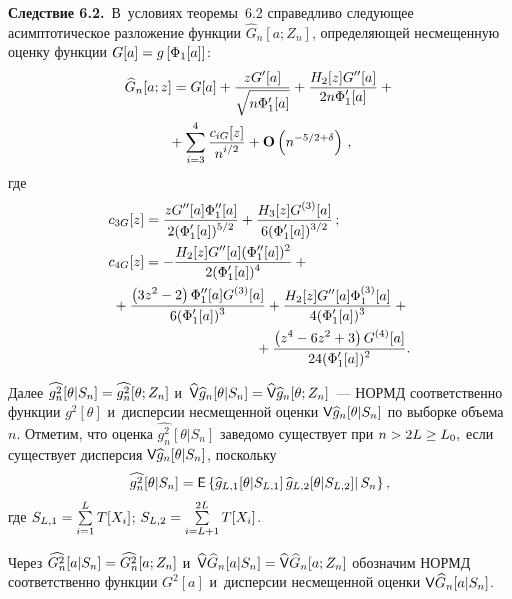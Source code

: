 \begin{multicols}{2}
\noindent
\textbf{Следствие 6.2.}\
 В~условиях теоремы~6.2 справедливо следующее асимптотическое разложение
  функции $\widehat{G}_n[a;Z_n]$, определяющей несмещенную оценку функции
  $G[a]\hm=g\left[\Phi_1[a]\right]$:
  \begin{multline*}
 \widehat{G}_n[a;z]=G[a]+\displaystyle\frac{\displaystyle z G'[a]\mathstrut}{\displaystyle \sqrt{n\Phi_1'[a]}\mathstrut}+
 \displaystyle\frac{\displaystyle H_2[z] G''[a]\mathstrut}{\displaystyle 2n \Phi_1'[a]\mathstrut} +{}\\
 {}+
 \sum\limits_{i=3}^4 \displaystyle\frac{\displaystyle c_{iG}[z]\mathstrut}{\displaystyle n^{i/2}\mathstrut}+\mathbf{O}\left(n^{-5/2+\delta}\right)\,,
 \end{multline*}
 где
 \begin{align*}
 c_{3G}[z]&=  \fr{z G''[a] \Phi_1''[a]}{2 (\Phi_1'[a])^{5/2}}+
 \fr{H_3[z] G^{(3)}[a]}{6 (\Phi_1'[a])^{3/2}}\,;
\\
 c_{4G}[z]&=  -\fr{H_2[z] G''[a] (\Phi_1''[a])^2}{2 (\Phi_1'[a])^4}+{}\\
& \hspace*{-8mm}{}+
 \fr{\left(3z^2-2\right) \Phi_1''[a] G^{(3)}[a]}{6 (\Phi_1'[a])^3}
 +\fr{H_2[z] G''[a] \Phi_1^{(3)}[a]}{4 (\Phi_1'[a])^3}+{}\\
&\hspace*{28mm} {}+
 \fr{\left(z^4-6 z^2+3\right) G^{(4)}[a]}{24 (\Phi_1'[a])^2}.
 \end{align*}


  Далее
  $\widehat{g^2_n}[\theta|S_n]\hm=\widehat{g^2_n}[\theta;Z_n]$ и~$\widehat{\Vp} \widehat{g}_n[\theta|S_n]\hm=\widehat{\Vp} \widehat{g}_n[\theta;Z_n]$~--- НОРМД соответственно функции $g^2[\theta]$ и~дисперсии несмещенной оценки ${\sf V}\widehat{g}_n[\theta|S_n]$ по выборке объема~$n$.
  Отметим, что оценка $\widehat{g^2_n}[\theta|S_n]$ заведомо существует при
  $n\hm> 2 L \hm\ge L_0,$ если существует дисперсия
  ${\sf V} \widehat{g}_n[\theta|S_n]$, поскольку
 \begin{equation*}
 \widehat{g^2_n}[\theta|S_n]=
 {\sf E}  \left\{
 \widehat{g}_{L,1}[\theta|S_{L,1}]\,
 \widehat{g}_{L,2}[\theta|S_{L,2}]|\, S_n \right\},
 \end{equation*}
 где
 $ S_{L,1}\hm=\sum\limits_{i=1}^L T[X_i]$;
 $S_{L,2}\hm=\sum\limits_{i=L+1}^{2L} T[X_i]$.

  Через
  $\widehat{G^2_n}[a|S_n]\hm=\widehat{G^2_n}[a;Z_n]$ и~$\widehat{\Vp} \widehat{G}_n[a|S_n]\hm=\widehat{\Vp}\widehat{G}_n[a;Z_n]$
  обозначим НОРМД соответственно функции $G^2[a]$ и~дисперсии несмещенной
  оценки ${\sf V}\widehat{G}_n[a|S_n]$.

\smallskip


\end{multicols}
